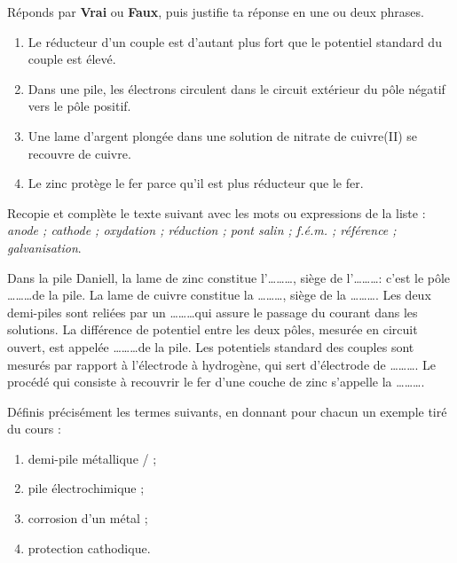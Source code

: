 \documentclass[11pt]{article}
\begin{document}
\begin{exercice}
Réponds par \textbf{Vrai} ou \textbf{Faux}, puis justifie ta réponse en une ou deux phrases.
\begin{enumerate}
\item Le réducteur d'un couple est d'autant plus fort que le potentiel standard du couple est élevé.
\item Dans une pile, les électrons circulent dans le circuit extérieur du pôle négatif vers le pôle positif.
\item Une lame d'argent plongée dans une solution de nitrate de cuivre(II) se recouvre de cuivre.
\item Le zinc protège le fer parce qu'il est plus réducteur que le fer.
\end{enumerate}
\end{exercice}

\begin{exercice}
Recopie et complète le texte suivant avec les mots ou expressions de la liste : \emph{anode ; cathode ; oxydation ; réduction ; pont salin ; f.é.m. ; référence ; galvanisation}.

Dans la pile Daniell, la lame de zinc constitue l'\ldots\ldots\ldots, siège de l'\ldots\ldots\ldots : c'est le pôle \ldots\ldots\ldots de la pile. La lame de cuivre constitue la \ldots\ldots\ldots, siège de la \ldots\ldots\ldots. Les deux demi-piles sont reliées par un \ldots\ldots\ldots qui assure le passage du courant dans les solutions. La différence de potentiel entre les deux pôles, mesurée en circuit ouvert, est appelée \ldots\ldots\ldots de la pile. Les potentiels standard des couples sont mesurés par rapport à l'électrode à hydrogène, qui sert d'électrode de \ldots\ldots\ldots. Le procédé qui consiste à recouvrir le fer d'une couche de zinc s'appelle la \ldots\ldots\ldots.
\end{exercice}

\begin{exercice}[Définitions]
Définis précisément les termes suivants, en donnant pour chacun un exemple tiré du cours :
\begin{enumerate}
\item demi-pile métallique / ;
\item pile électrochimique ;
\item corrosion d'un métal ;
\item protection cathodique.
\end{enumerate}
\end{exercice}
\end{document}
